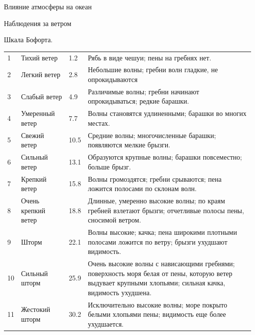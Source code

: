 \begin{chapter}{Влияние атмосферы на океан}
\begin{section}{Наблюдения за ветром}
\begin{paragraph}{Шкала Бофорта.}
\begin{table}
\begin{footnotesize}
\begin{tabular}{|p{}|p{}|p{}|p{}|}
1 & Тихий ветер & 1.2 &
Рябь в виде чешуи; пены на гребнях нет. \\

2 & Легкий ветер & 2.8 &
Небольшие волны; гребни волн гладкие, не опрокидываются \\

3 & Слабый ветер & 4.9 & 
Различимые волны; гребни начинают опрокидываться; редкие барашки. \\

4 & Умеренный ветер & 7.7 &
Волны становятся удлиненными; барашки во многих местах. \\

5 & Свежий ветер & 10.5 &
Средние волны; многочисленные барашки; появляются мелкие брызги. \\

6 & Сильный ветер & 13.1 & 
Образуются крупные волны; барашки повсеместно; больше брызг. \\

7 & Крепкий ветер & 15.8 & 
Волны громоздятся; гребни срываются; пена ложится полосами по склонам
волн. \\

8 & Очень крепкий ветер & 18.8 &
Длинные, умеренно высокие волны; по краям гребней взлетают брызги;
отчетливые полосы пены, сносимой ветром. \\

9 & Шторм & 22.1 & 
Волны высокие; качка; пена широкими плотными полосами ложится по
ветру; брызги ухудшают видимость. \\

10 & Сильный шторм & 25.9 & 
Очень высокие волны с нависающими гребнями; поверхность моря белая от
пены, которую ветер выдувает крупными хлопьями; сильная качка,
видимость ухудшена. \\

11 & Жестокий шторм & 30.2 & 
Исключительно высокие волны; море покрыто белыми хлопьями пены;
видимость еще более ухудшается. \\


\end{tabular}
\end{footnotesize}
\end{table}
\end{paragraph}
\end{section}
\end{chapter}
